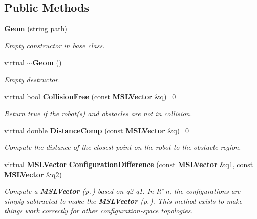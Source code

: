 \subsection*{Public Methods}
\begin{CompactItemize}
\item 
{\bf Geom} (string path)
\begin{CompactList}\small\item\em Empty constructor in base class.\item\end{CompactList}\item 
virtual {\bf $\sim$Geom} ()
\begin{CompactList}\small\item\em Empty destructor.\item\end{CompactList}\item 
virtual bool {\bf Collision\-Free} (const {\bf MSLVector} \&q)=0
\begin{CompactList}\small\item\em Return true if the robot(s) and obstacles are not in collision.\item\end{CompactList}\item 
virtual double {\bf Distance\-Comp} (const {\bf MSLVector} \&q)=0
\begin{CompactList}\small\item\em Compute the distance of the closest point on the robot to the obstacle region.\item\end{CompactList}\item 
virtual {\bf MSLVector} {\bf Configuration\-Difference} (const {\bf MSLVector} \&q1, const {\bf MSLVector} \&q2)
\begin{CompactList}\small\item\em Compute a {\bf MSLVector} {\rm (p.\,\pageref{class_MSLVector})} based on q2-q1. In R$^\wedge$n, the configurations are simply subtracted to make the {\bf MSLVector} {\rm (p.\,\pageref{class_MSLVector})}. This method exists to make things work correctly for other configuration-space topologies.\item\end{CompactList}\end{CompactItemize}
